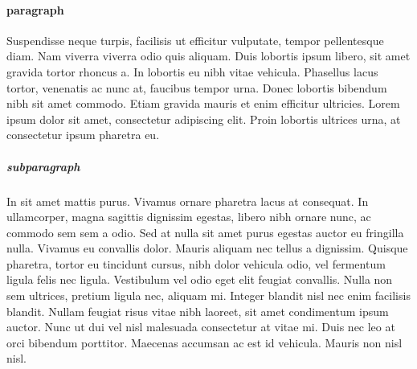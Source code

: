 \documentclass{book}
\begin{document}
\paragraph{paragraph}

Suspendisse neque turpis, facilisis ut efficitur vulputate, tempor pellentesque diam. Nam viverra viverra odio quis aliquam. Duis lobortis ipsum libero, sit amet gravida tortor rhoncus a. In lobortis eu nibh vitae vehicula. Phasellus lacus tortor, venenatis ac nunc at, faucibus tempor urna. Donec lobortis bibendum nibh sit amet commodo. Etiam gravida mauris et enim efficitur ultricies. Lorem ipsum dolor sit amet, consectetur adipiscing elit. Proin lobortis ultrices urna, at consectetur ipsum pharetra eu.

\subparagraph{subparagraph}

In sit amet mattis purus. Vivamus ornare pharetra lacus at consequat. In ullamcorper, magna sagittis dignissim egestas, libero nibh ornare nunc, ac commodo sem sem a odio. Sed at nulla sit amet purus egestas auctor eu fringilla nulla. Vivamus eu convallis dolor. Mauris aliquam nec tellus a dignissim. Quisque pharetra, tortor eu tincidunt cursus, nibh dolor vehicula odio, vel fermentum ligula felis nec ligula. Vestibulum vel odio eget elit feugiat convallis. Nulla non sem ultrices, pretium ligula nec, aliquam mi. Integer blandit nisl nec enim facilisis blandit. Nullam feugiat risus vitae nibh laoreet, sit amet condimentum ipsum auctor. Nunc ut dui vel nisl malesuada consectetur at vitae mi. Duis nec leo at orci bibendum porttitor. Maecenas accumsan ac est id vehicula. Mauris non nisl nisl.
\end{document}
